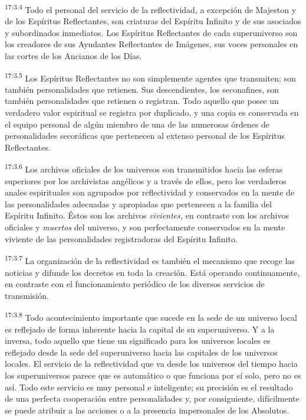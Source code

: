 \par
\textsuperscript{17:3.4} Todo el personal del servicio de la reflectividad, a excepción de Majeston y de los Espíritus Reflectantes, son criaturas del Espíritu Infinito y de sus asociados y subordinados inmediatos. Los Espíritus Reflectantes de cada superuniverso son los creadores de sus Ayudantes Reflectantes de Imágenes, sus voces personales en las cortes de los Ancianos de los Días.

\par
\textsuperscript{17:3.5} Los Espíritus Reflectantes no son simplemente agentes que transmiten; son también personalidades que retienen. Sus descendientes, los seconafines, son también personalidades que retienen o registran. Todo aquello que posee un verdadero valor espiritual se registra por duplicado, y una copia es conservada en el equipo personal de algún miembro de una de las numerosas órdenes de personalidades secoráficas que pertenecen al extenso personal de los Espíritus Reflectantes.

\par
\textsuperscript{17:3.6} Los archivos oficiales de los universos son transmitidos hacia las esferas superiores por los archivistas angélicos y a través de ellos, pero los verdaderos anales espirituales son agrupados por reflectividad y conservados en la mente de las personalidades adecuadas y apropiadas que pertenecen a la familia del Espíritu Infinito. Éstos son los archivos \textit{vivientes,} en contraste con los archivos oficiales y \textit{muertos} del universo, y son perfectamente conservados en la mente viviente de las personalidades registradoras del Espíritu Infinito.

\par
\textsuperscript{17:3.7} La organización de la reflectividad es también el mecanismo que recoge las noticias y difunde los decretos en toda la creación. Está operando continuamente, en contraste con el funcionamiento periódico de los diversos servicios de transmisión.

\par
\textsuperscript{17:3.8} Todo acontecimiento importante que sucede en la sede de un universo local es reflejado de forma inherente hacia la capital de su superuniverso. Y a la inversa, todo aquello que tiene un significado para los universos locales es reflejado desde la sede del superuniverso hacia las capitales de los universos locales. El servicio de la reflectividad que va desde los universos del tiempo hacia los superuniversos parece que es automático o que funciona por sí solo, pero no es así. Todo este servicio es muy personal e inteligente; su precisión es el resultado de una perfecta cooperación entre personalidades y, por consiguiente, difícilmente se puede atribuir a las acciones o a la presencia impersonales de los Absolutos.

